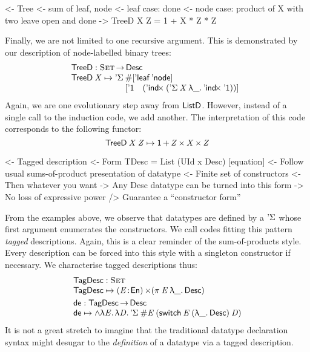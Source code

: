 \begin{wstructure}
<- Tree
    <- sum of leaf, node
    <- leaf case: done
    <- node case: product of X with two leave open and done
    -> TreeD X Z = 1 + X * Z * Z
\end{wstructure}

Finally, we are not limited to one recursive argument. This is
demonstrated by our description of node-labelled binary trees:
%
\[\stk{
\TreeD : \Set \To \Desc \\
\begin{array}{@{}l@{}l}
\TreeD \: \V{X} \mapsto 
    \DSigma{ & \EnumT{\sqr{ \TreeLeaf\: \TreeNode }} \\}
           { & \sqr{ \DUnit \quad
                     (\DIndx{(\DSigma{\V{X}}{\LAM{\_}\DIndx{\DUnit}})})} }
\end{array}
}\]
%
Again, we are one evolutionary step away from $\ListD$. However,
instead of a single call to the induction code, we add another. The
interpretation of this code corresponds to the following functor:
%
\[    \TreeD\: \V{X}\: \V{Z} \mapsto \Unit \mathop{\D{+}} 
          \V{Z} \Prod \V{X}  \Prod \V{Z}     \]


\begin{wstructure}
<- Tagged description
    <- Form TDesc = List (UId x Desc) [equation]
    <- Follow usual sums-of-product presentation of datatype
        <- Finite set of constructors
        <- Then whatever you want
    -> Any Desc datatype can be turned into this form
        -> No loss of expressive power
        /> Guarantee a ``constructor form''
\end{wstructure}

From the examples above, we observe that datatypes are defined by a
$\SYMBDSigma$ whose first argument enumerates the constructors. We
call codes fitting this pattern \emph{tagged} descriptions. Again,
this is a clear reminder of the sum-of-products style. Every
description can be forced into this style with a singleton constructor
if necessary. We characterise tagged descriptions thus:
\[\stk{
 \TagDesc : \Set \\
 \TagDesc \mapsto \SIGMA{\V{E}}{\EnumU} (\spi{\V{E}}{\LAM{\_} \Desc})
\smallskip\\
\SYMBtoDesc : \TagDesc\To\Desc \\
\SYMBtoDesc \mapsto
\spl{\LAM{\V{E}}\LAM{\V{D}}
\DSigma{\EnumT{\V{E}}}{(\F{switch}\:\V{E}\:(\LAM{\_}\Desc)\:\V{D})}}
}\]
It is not a great stretch to imagine that the traditional datatype
declaration syntax might desugar to the \emph{definition} of a datatype
via a tagged description.

